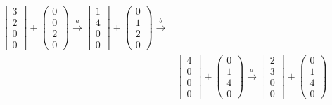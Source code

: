 \documentclass[a4paper]{scrartcl}
\begin{document}
\begin{enumerate}
\begin{itemize}
\begin{equation}
\begin{split}
\begin{bmatrix}
                            3 \\ 2 \\ 0 \\ 0
                        \end{bmatrix}
                        +
                        \begin{pmatrix}
                            0 \\ 0 \\ 2 \\ 0
                        \end{pmatrix}
                        \stackrel{a}{\to}
                        \begin{bmatrix}
                            1 \\ 4 \\ 0 \\ 0
                        \end{bmatrix}
                        +
                        \begin{pmatrix}
                            0 \\ 1 \\ 2 \\ 0
                        \end{pmatrix}
                        \stackrel{b}{\to}
                        \\
                        &
                        \begin{bmatrix}
                            4 \\ 0 \\ 0 \\ 0
                        \end{bmatrix}
                        +
                        \begin{pmatrix}
                            0 \\ 1 \\ 4 \\ 0
                        \end{pmatrix}
                        \stackrel{a}{\to}
                        \begin{bmatrix}
                            2 \\ 3 \\ 0 \\ 0
                        \end{bmatrix}
                        +
                        \begin{pmatrix}
                            0 \\ 1 \\ 4 \\ 0

\end{pmatrix}
\end{split}
\end{equation}
\end{itemize}
\end{enumerate}
\end{document}
